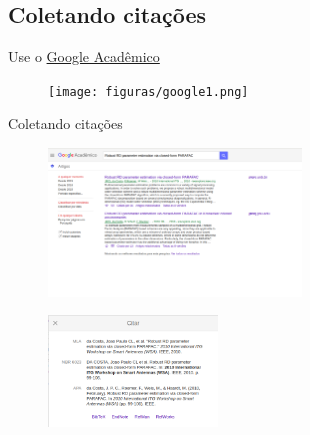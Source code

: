 \subsection*{Coletando citações}

\begin{frame}{Use o \href{http://scholar.google.com.br}{Google Acadêmico}}
	
\begin{figure}[htbp!]
	\centering
	\texttt{[image: figuras/google1.png]}
	\caption{ }
\end{figure}
\end{frame}

\begin{frame}{Coletando citações}
	
\begin{multicols}{2}
\begin{figure}[htbp!]
	\includegraphics[width=0.6\textwidth]{figuras/google2.png}
	\caption{ }
\end{figure}
	
\begin{figure}[htbp!]
	\centering
	\includegraphics[width=0.4\textwidth]{figuras/google3.png}
	\caption{ }
\end{figure}
\end{multicols}
\end{frame}
	


